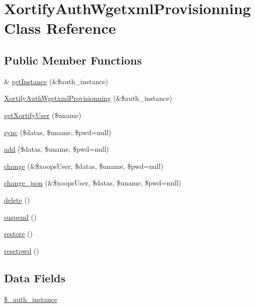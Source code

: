 \hypertarget{class_xortify_auth_wgetxml_provisionning}{\section{Xortify\-Auth\-Wgetxml\-Provisionning Class Reference}
\label{class_xortify_auth_wgetxml_provisionning}
}
\subsection*{Public Member Functions}
\begin{DoxyCompactItemize}
\item 
\& \hyperlink{class_xortify_auth_wgetxml_provisionning_a2c8eaa915c70d75289ac8a03686194f9}{get\-Instance} (\&\$auth\-\_\-instance)
\item 
\hyperlink{class_xortify_auth_wgetxml_provisionning_a19fcb3e96d11cb81e368ba658ee38dfb}{Xortify\-Auth\-Wgetxml\-Provisionning} (\&\$auth\-\_\-instance)
\item 
\hyperlink{class_xortify_auth_wgetxml_provisionning_a041d726ac26672547ed1504e8e0117aa}{get\-Xortify\-User} (\$uname)
\item 
\hyperlink{class_xortify_auth_wgetxml_provisionning_a35dc08b0f2138eb818ff95345b73bcff}{sync} (\$datas, \$uname, \$pwd=null)
\item 
\hyperlink{class_xortify_auth_wgetxml_provisionning_adfc9fcef01e7bd7b2f47e8e79d51fc63}{add} (\$datas, \$uname, \$pwd=null)
\item 
\hyperlink{class_xortify_auth_wgetxml_provisionning_ae1f0971b9712c794620cf309164e43af}{change} (\&\$xoops\-User, \$datas, \$uname, \$pwd=null)
\item 
\hyperlink{class_xortify_auth_wgetxml_provisionning_a94f4e0408f26e65abca347ec883f4ec9}{change\-\_\-json} (\&\$xoops\-User, \$datas, \$uname, \$pwd=null)
\item 
\hyperlink{class_xortify_auth_wgetxml_provisionning_a13bdffdd926f26b825ea57066334ff01}{delete} ()
\item 
\hyperlink{class_xortify_auth_wgetxml_provisionning_ad73006a505121228f3b075c2409787d2}{suspend} ()
\item 
\hyperlink{class_xortify_auth_wgetxml_provisionning_aa1371f22826cf8cde4454c9b467203d0}{restore} ()
\item 
\hyperlink{class_xortify_auth_wgetxml_provisionning_a06d70fbd3a2db390b6f2530c0076628e}{resetpwd} ()
\end{DoxyCompactItemize}
\subsection*{Data Fields}
\begin{DoxyCompactItemize}
\item 
\hyperlink{class_xortify_auth_wgetxml_provisionning_a486ed878bb5a7188c99ac4c9ee46ac6e}{\$\-\_\-auth\-\_\-instance}
\end{DoxyCompactItemize}


